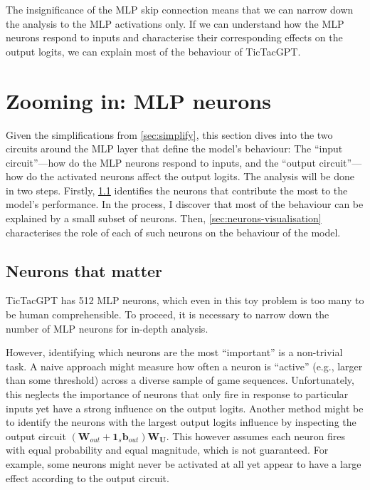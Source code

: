 \documentclass{article}
\newcommand{\ttgpt}{TicTacGPT\xspace}
\renewcommand{\v}[1]{\mathbf{\bm{#1}}}
\newcommand{\m}[1]{\mathbf{\bm{#1}}}
\newcounter{num}
\begin{document}
The insignificance of the MLP skip connection means that we can narrow down the analysis to the MLP activations only. If we can understand how the MLP neurons respond to inputs and characterise their corresponding effects on the output logits, we can explain most of the behaviour of \ttgpt.

\section{Zooming in: MLP neurons}

Given the simplifications from \cref{sec:simplify}, this section dives into the two circuits around the MLP layer that define the model's behaviour: The ``input circuit''---how do the MLP neurons respond to inputs, and the ``output circuit''---how do the activated neurons affect the output logits. The analysis will be done in two steps. Firstly, \cref{sec:neurons-that-matter} identifies the neurons that contribute the most to the model's performance. In the process, I discover that most of the behaviour can be explained by a small subset of neurons. Then, \cref{sec:neurons-visualisation} characterises the role of each of such neurons on the behaviour of the model.

\subsection{Neurons that matter} \label{sec:neurons-that-matter}



\ttgpt has 512 MLP neurons, which even in this toy problem is too many to be human comprehensible. To proceed, it is necessary to narrow down the number of MLP neurons for in-depth analysis.

However, identifying which neurons are the most ``important'' is a non-trivial task. A naive approach might measure how often a neuron is ``active'' (e.g., larger than some threshold) across a diverse sample of game sequences. Unfortunately, this neglects the importance of neurons that only fire in response to particular inputs yet have a strong influence on the output logits. Another method might be to identify the neurons with the largest output logits influence by inspecting the output circuit $(\m{W}_{out} + \v{1}_s \v{b}_{out}) \m{W_U}$. This however assumes each neuron fires with equal probability and equal magnitude, which is not guaranteed. For example, some neurons might never be activated at all yet appear to have a large effect according to the output circuit.
\end{document}
